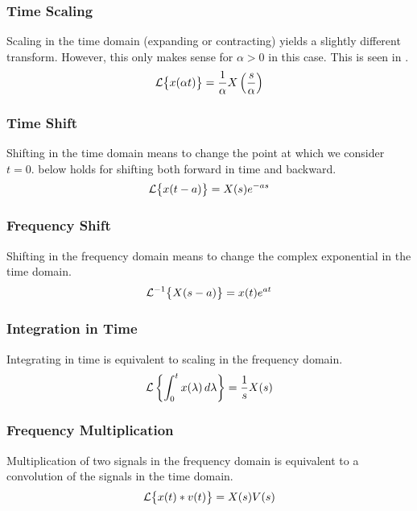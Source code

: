 \subsubsection{Time Scaling}\label{subsubsec:Laplace_Time_Scaling}
Scaling in the time domain (expanding or contracting) yields a slightly different transform.
However, this only makes sense for $\alpha > 0$ in this case.
This is seen in .
\begin{equation}\label{eq:Laplace_Time_Scaling}
  \operatorname{\mathcal{L}} \bigl\lbrace x(\alpha t) \bigr\rbrace = \frac{1}{\alpha} X \left( \frac{s}{\alpha} \right)
\end{equation}

\subsubsection{Time Shift}\label{subsubsec:Laplace_Time_Shift}
Shifting in the time domain means to change the point at which we consider $t=0$.
 below holds for shifting both forward in time and backward.
\begin{equation}\label{eq:Laplace_Time_Shifting}
  \operatorname{\mathcal{L}} \bigl\lbrace x(t-a) \bigr\rbrace = X(s) e^{-a s}
\end{equation}

\subsubsection{Frequency Shift}\label{subsubsec:Laplace_Frequency_Shift}
Shifting in the frequency domain means to change the complex exponential in the time domain.
\begin{equation}\label{eq:Laplace_Frequency_Shift}
  \operatorname{\mathcal{L}}^{-1} \bigl\lbrace X(s-a) \bigr\rbrace = x(t)e^{at}
\end{equation}

\subsubsection{Integration in Time}\label{subsubsec:Laplace_Time_Integration}
Integrating in time is equivalent to scaling in the frequency domain.
\begin{equation}\label{eq:Laplace_Time_Integration}
  \operatorname{\mathcal{L}} \left\lbrace \int_{0}^{t} x(\lambda) \, d\lambda \right\rbrace = \frac{1}{s} X(s)
\end{equation}

\subsubsection{Frequency Multiplication}\label{subsubsec:Laplace_Frequency_Multiplication}
Multiplication of two signals in the frequency domain is equivalent to a convolution of the signals in the time domain.
\begin{equation}\label{eq:Laplace_Frequency_Multiplication}
  \operatorname{\mathcal{L}} \bigl\lbrace x(t) * v(t) \bigr\rbrace = X(s) V(s)
\end{equation}

